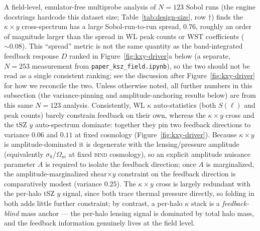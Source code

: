 \documentclass[11pt]{article}
\newcommand{\bind}{\textsc{bind}}
\newcommand{\Sell}{S(\ell)}                    %
\newcommand{\kappay}{\kappa\times y}
\begin{document}
A field-level, emulator-free multiprobe analysis of $N=123$ Sobol runs (the
engine docstrings hardcode this dataset size; Table~\ref{tab:design-size},
row $\dagger$) finds the $\kappay$ cross-spectrum has a large
Sobol-run-to-run spread, $0.76$, roughly an order of magnitude larger
than the spread in WL peak counts or WST coefficients ($\sim\!0.08$). %
This ``spread'' metric is not the same quantity as the band-integrated
feedback response $D$ ranked in Figure~\ref{fig:kxy-driver}a below (a
separate, $N=253$ measurement from \texttt{paper\_ksz\_field.ipynb}), so the
two should not be read as a single consistent ranking; see the discussion
after Figure~\ref{fig:kxy-driver} for how we reconcile the two. Unless
otherwise noted, all further numbers in this subsection (the variance-pinning
and amplitude-anchoring results below) are from this same $N=123$ analysis.
Consistently, WL $\kappa$ auto-statistics (both $\Sell$ and peak counts)
barely constrain feedback on their own, whereas the $\kappay$ cross and
the tSZ $y$ auto-spectrum dominate: together they pin two feedback
directions to variance $0.06$ and $0.11$ at fixed cosmology
(Figure~\ref{fig:kxy-driver}). %
Because $\kappay$ is amplitude-dominated it is degenerate with the
lensing/pressure amplitude (equivalently $\sigma_8$/$\Omega_m$ at fixed
\bind{} cosmology), so an explicit amplitude nuisance parameter $A$ is
required to isolate the feedback direction; once $A$ is marginalized, the
amplitude-marginalized shear$\times y$ constraint on the feedback
direction is comparatively modest (variance $0.25$). %
The $\kappay$ cross is largely redundant with the per-halo tSZ $y$
signal, since both trace thermal pressure directly, so folding in both
adds little further constraint; by contrast, a per-halo $\kappa$ stack is
a \emph{feedback-blind} mass anchor — the per-halo lensing signal is
dominated by total halo mass, and the feedback information genuinely lives
at the field level. %
\end{document}
